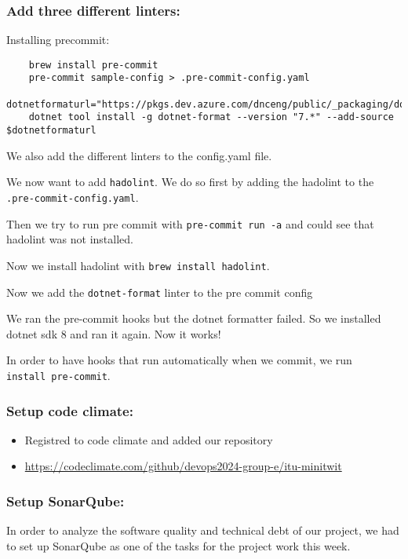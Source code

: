 \subsubsection{Add three different linters:}
\label{log:add-three-different-linters}

Installing precommit:
\begin{verbatim}
    brew install pre-commit
    pre-commit sample-config > .pre-commit-config.yaml
    dotnetformaturl="https://pkgs.dev.azure.com/dnceng/public/_packaging/dotnet7/nuget/v3/index.json"
    dotnet tool install -g dotnet-format --version "7.*" --add-source $dotnetformaturl
\end{verbatim}

We also add the different linters to the config.yaml file.

We now want to add \texttt{hadolint}. We do so first by adding the
hadolint to the \texttt{.pre-commit-config.yaml}.

Then we try to run pre commit with \texttt{pre-commit\ run\ -a} and
could see that hadolint was not installed.

Now we install hadolint with \texttt{brew\ install\ hadolint}.

Now we add the \texttt{dotnet-format} linter to the pre commit config

We ran the pre-commit hooks but the dotnet formatter failed. So we
installed dotnet sdk 8 and ran it again. Now it works!

In order to have hooks that run automatically when we commit, we run
\texttt{install\ pre-commit}.

\subsubsection{Setup code climate:}
\label{log:setup-code-climate}

\begin{itemize}
    \item Registred to code climate and added our repository
    \item \url{https://codeclimate.com/github/devops2024-group-e/itu-minitwit}
\end{itemize}

\subsubsection{Setup SonarQube:}
\label{log:setup-sonarqube}

In order to analyze the software quality and technical debt of our project, we had to set up SonarQube as one of the tasks for the project work this week.

